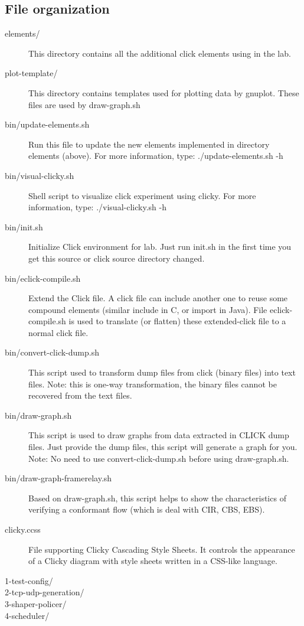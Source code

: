 \documentclass[a4paper]{article}
\begin{document}
    \subsection{File organization}
      \begin{description}
      	\item[elements/] This directory contains all the additional click elements using in the lab.
      	\item[plot-template/] This directory contains templates used for plotting data by gnuplot. These files are used by draw-graph.sh
      	\item[bin/update-elements.sh] Run this file to update the new elements implemented in directory elements (above). For more information, type: ./update-elements.sh -h
      	\item[bin/visual-clicky.sh]Shell script to visualize click experiment using clicky. For more information, type: ./visual-clicky.sh -h
      	\item[bin/init.sh]Initialize Click environment for lab. Just run init.sh in the first time you get this source or click source directory changed.
      	\item[bin/eclick-compile.sh] Extend the Click file. A click file can include another one to reuse some compound elements (similar include in C, or import in Java). File eclick-compile.sh is used to translate (or flatten) these extended-click file to a normal click file.
      	\item[bin/convert-click-dump.sh]This script used to transform dump files from click (binary files) into text files. Note: this is one-way transformation, the binary files cannot be recovered from the text files.
      	\item[bin/draw-graph.sh] This script is used to draw graphs from data extracted in CLICK dump files. Just provide the dump files, this script will generate a graph for you. Note: No need to use convert-click-dump.sh before using draw-graph.sh.
      	\item[bin/draw-graph-framerelay.sh] Based on draw-graph.sh, this script helps to show the characteristics of verifying a conformant flow (which is deal with CIR, CBS, EBS).
      	\item[clicky.ccss] File supporting Clicky Cascading Style Sheets. It controls the appearance of a Clicky diagram with style sheets written in a CSS-like language.      	
      	\item[1-test-config/]
      	\item[2-tcp-udp-generation/]
      	\item[3-shaper-policer/]
      	\item[4-scheduler/]
      \end{description}
    
\end{document}
